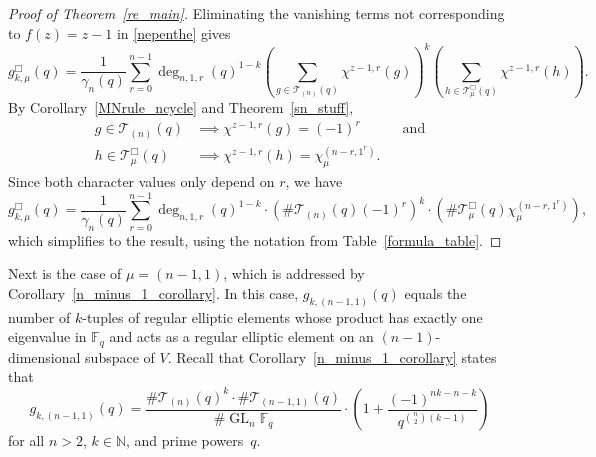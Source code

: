 \documentclass[10pt]{article}
\theoremstyle{definition}
\DeclareMathOperator{\GL}{GL}
\newcommand{\F}{\mathbb{F}}
\newcommand{\N}{\mathbb{N}}
\newcommand{\CT}{\mathcal{T}}
\begin{document}
\begin{proof}[Proof of Theorem~\ref{re_main}]
Eliminating the vanishing terms not corresponding to \(f(z) = z-1\) in \eqref{nepenthe} gives
\[
g_{k,\mu}^\Box (q)
=
\frac{1}{\gamma_n(q)}
\sum_{r = 0}^{n-1}
\deg_{n,1,r}(q)^{1-k}
\left (
\sum_{g \in \CT_{(n)} (q)} \chi^{z-1,r} (g)
\right )^k
\left (
\sum_{h \in \CT_\mu^\Box (q)} \chi^{z-1,r} (h)
\right ).
\]
By
Corollary~\ref{MNrule_ncycle}
and
Theorem~\ref{sn_stuff},
\begin{align*}
g \in \CT_{(n)} (q) & \implies \chi^{z-1,r}(g) = (-1)^r \quad \quad \quad \text{and}\\
h \in \CT_\mu^\Box (q)   & \implies \chi^{z-1,r}(h) = \chi^{(n-r,1^r)}_\mu.
\end{align*}
Since both character values only depend on \(r\), we have
\[
g_{k,\mu}^\Box (q)
=
\frac{1}{\gamma_n(q)}
\sum_{r = 0}^{n-1}
\deg_{n,1,r}(q)^{1-k}
\cdot
\left (
\# \CT_{(n)} (q) (-1)^r
\right )^k
\cdot
\left (
\# \CT_\mu^\Box (q) \chi^{(n-r,1^r)}_\mu
\right ),
\]
which simplifies to the result, using the notation from Table~\ref{formula_table}.
\end{proof}







































Next is the case of \(\mu = (n-1,1)\), which is addressed by Corollary~\ref{n_minus_1_corollary}.
In this case, \(g_{k,(n-1,1)} (q)\) equals the number of \(k\)-tuples of regular elliptic elements whose product has exactly one eigenvalue in \(\F_q\) and acts as a regular elliptic element on an \((n-1)\)-dimensional subspace of \(V\).
Recall that Corollary~\ref{n_minus_1_corollary} states that
\begin{equation}
g_{k,(n-1,1)} (q)
=
\frac{\# \CT_{(n)} (q)^k
\cdot
\# \CT_{(n-1,1)} (q)}{\# \GL_n \F_q}
\cdot
\left (
1 + \frac{(-1)^{nk-n-k}}{q^{\binom{n}{2}(k-1)}}
\right )
\end{equation}
for all \(n > 2\), \(k \in \N\), and prime powers~\(q\).
\end{document}
